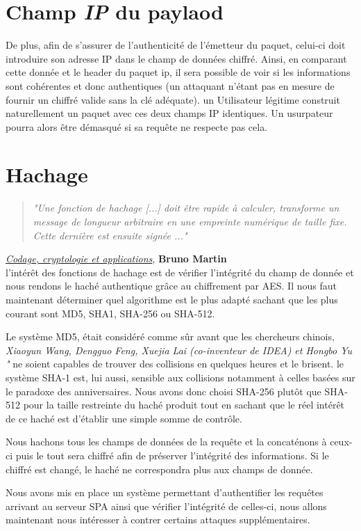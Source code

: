 \section{Champ \textbf{\emph{IP}} du paylaod}

De plus, afin de s'assurer de l'authenticité de l'émetteur du paquet, celui-ci doit introduire son adresse IP dans le champ de données chiffré. Ainsi, en comparant cette donnée et le header du paquet ip, il sera possible de voir si les informations sont cohérentes et donc authentiques (un attaquant n'étant pas en mesure de fournir un chiffré valide sans la clé adéquate). 
un Utilisateur légitime construit naturellement un paquet avec ces deux champs IP identiques. Un usurpateur pourra alors être démasqué si sa requête ne respecte pas cela.

\section{Hachage}
\begin{quotation}
\emph{"Une fonction de hachage [...] doit être rapide à calculer, transforme un message de longueur arbitraire en une empreinte numérique de taille fixe. Cette dernière est ensuite signée ..."}
\end{quotation}
\underline{\emph{Codage, cryptologie et applications}}, \textbf{Bruno Martin}\\

l'intérêt des fonctions de hachage est de vérifier l'intégrité du champ de donnée et nous rendons le haché authentique grâce au chiffrement par AES.
Il nous faut maintenant déterminer quel algorithme est le plus adapté sachant que les plus courant sont MD5, SHA1, SHA-256 ou SHA-512.\newline

Le système MD5, était considéré comme sûr avant que les chercheurs chinois, \emph{Xiaoyun Wang, Dengguo Feng, Xuejia Lai (co-inventeur de IDEA) et Hongbo Yu "} ne soient capables de trouver des collisions en quelques heures et le brisent.
le système SHA-1 est, lui aussi, sensible aux collisions notamment à celles basées sur le paradoxe des anniversaires.
Nous avons donc choisi SHA-256 plutôt que SHA-512 pour la taille restreinte du haché produit tout en sachant que le réel intérêt de ce haché est d'établir une simple somme de contrôle.\newline

Nous hachons tous les champs de données de la requête et la concaténons à ceux-ci puis le tout sera chiffré afin de préserver l'intégrité des informations. Si le chiffré est changé, le haché ne correspondra plus aux champs de donnée.

Nous avons mis en place un système permettant d'authentifier les requêtes arrivant au serveur SPA ainsi que vérifier l'intégrité de celles-ci, nous allons maintenant nous intéresser à contrer certains attaques supplémentaires.
 
 

